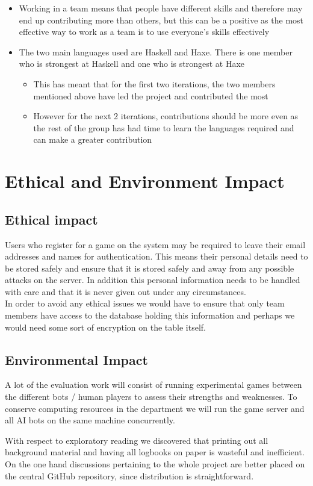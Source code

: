 \documentclass[12pt]{article}
\begin{document}
\begin{itemize}
\item Working in a team means that people have different skills and therefore
may end up contributing more than others, but this can be a positive
as the most effective way to work as a team is to use everyone's skills
effectively
\item The two main languages used are Haskell and Haxe. There is one member
who is strongest at Haskell and one who is strongest at Haxe

\begin{itemize}
\item This has meant that for the first two iterations, the two members
mentioned above have led the project and contributed the most
\item However for the next 2 iterations, contributions should be more even
as the rest of the group has had time to learn the languages required
and can make a greater contribution
\end{itemize}
\end{itemize}

\section{Ethical and Environment Impact}

\subsection{Ethical impact}

Users who register for a game on the system may be required to leave
their email addresses and names for authentication. This means their
personal details need to be stored safely and ensure that it is stored
safely and away from any possible attacks on the server. In addition
this personal information needs to be handled with care and that it
is never given out under any circumstances.\\
In order to avoid any ethical issues we would have to ensure that
only team members have access to the database holding this information
and perhaps we would need some sort of encryption on the table itself.

\subsection{Environmental Impact }

A lot of the evaluation work will consist of running experimental
games between the different bots / human players to assess their 
strengths and weaknesses. To conserve computing resources in the 
department we will run the game server and all AI bots on the same
machine concurrently. 

With respect to exploratory reading we discovered that printing
out all background material and having all logbooks on paper is wasteful
and inefficient. On the one hand discussions pertaining to the
whole project are better placed on the central GitHub repository, since 
distribution is straightforward. 

\end{document}
